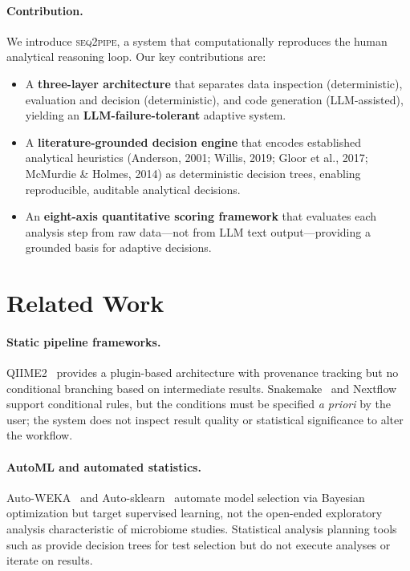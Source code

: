 \documentclass[11pt,a4paper]{article}
\newcommand{\seqpipe}{\textsc{seq2pipe}}
\begin{document}
\paragraph{Contribution.}
We introduce \seqpipe, a system that computationally reproduces the
human analytical reasoning loop.
Our key contributions are:
\begin{itemize}
  \item A \textbf{three-layer architecture} that separates
        data inspection (deterministic), evaluation and decision
        (deterministic), and code generation (LLM-assisted),
        yielding an \textbf{LLM-failure-tolerant} adaptive system.
  \item A \textbf{literature-grounded decision engine} that encodes
        established analytical heuristics
        (Anderson, 2001; Willis, 2019; Gloor et al., 2017;
         McMurdie \& Holmes, 2014) as deterministic decision trees,
        enabling reproducible, auditable analytical decisions.
  \item An \textbf{eight-axis quantitative scoring framework} that
        evaluates each analysis step from raw data---not from LLM
        text output---providing a grounded basis for adaptive decisions.
\end{itemize}

\section{Related Work}
\label{sec:related}

\paragraph{Static pipeline frameworks.}
QIIME2~\citep{qiime2} provides a plugin-based architecture with
provenance tracking but no conditional branching based on intermediate
results.
Snakemake~\citep{snakemake} and Nextflow~\citep{nextflow} support
conditional rules, but the conditions must be specified \emph{a priori}
by the user; the system does not inspect result quality or statistical
significance to alter the workflow.

\paragraph{AutoML and automated statistics.}
Auto-WEKA~\citep{autoweka} and Auto-sklearn~\citep{autosklearn}
automate model selection via Bayesian optimization but target
supervised learning, not the open-ended exploratory analysis
characteristic of microbiome studies.
Statistical analysis planning tools such as \citet{wasserstein2019}
provide decision trees for test selection but do not execute analyses
or iterate on results.
\end{document}
